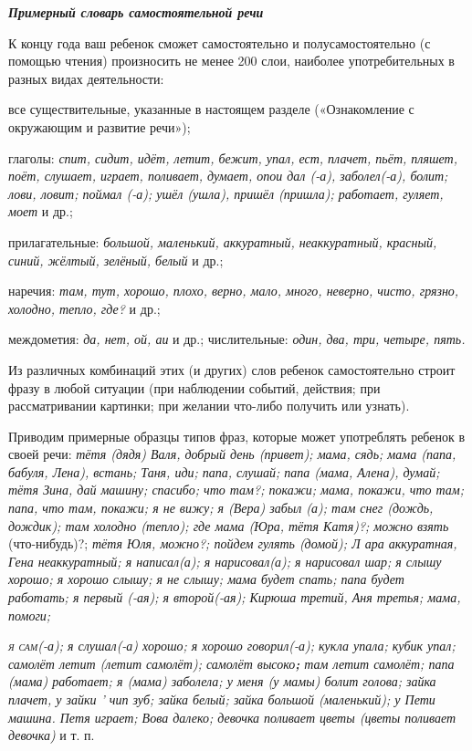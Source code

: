 \documentclass{book}
\renewcommand{\emph}[1]{\textit{#1}}
\begin{document}
\emph{\textbf{Примерный словарь самостоятельной речи}}

К концу года ваш ребенок сможет самостоятельно и полусамостоятельно (с
помощью чтения) произносить не менее 200 слои, наиболее употребительных
в разных видах деятельности:

все существительные, указанные в настоящем разделе («Ознакомление с
окружающим и развитие речи»);

глаголы: \emph{спит, сидит, идёт, летит, бежит, упал, ест, плачет, пьёт,
пляшет, поёт, слушает, играет, поливает, думает, опои дал (-а),
заболел(-а), болит; лови, ловит; поймал (-а); ушёл (ушла), пришёл
(пришла); работает, гуляет, моет} и др.;

прилагательные: \emph{большой, маленький, аккуратный, неаккуратный,
красный, синий, жёлтый, зелёный, белый} и др.;

наречия: \emph{там, тут, хорошо, плохо, верно, мало, много, неверно,
чисто, грязно, холодно, тепло, где?} и др.;

междометия: \emph{да, нет, ой, аи} и др.; числительные: \emph{один, два,
три, четыре, пять.}

Из различных комбинаций этих (и других) слов ребенок самостоятельно
строит фразу в любой ситуации (при наблюдении событий, действия; при
рассматривании картинки; при желании что-либо получить или узнать).

Приводим примерные образцы типов фраз, которые может употреблять ребенок
в своей речи: \emph{тётя (дядя) Валя, добрый день (привет); мама, сядь;
мама (папа, бабуля, Лена), встань; Таня, иди; папа, слушай; папа (мама,
Алена), думай; тётя Зина, дай машину; спасибо; что там?; покажи; мама,
покажи, что там; папа, что там, покажи; я не вижу; я (Вера) забыл (а);
там снег (дождь, дождик); там холодно (тепло); где мама (Юра, тётя
Катя)?; можно взять} (что-нибудь)?; \emph{тётя Юля, можно?; пойдем
гулять (домой); Л ара аккуратная, Гена неаккуратный; я написал(а); я
нарисовал(а); я нарисовал шар; я слышу хорошо; я хорошо слышу; я не
слышу; мама будет спать; папа будет работать; я первый (-ая); я
второй(-ая); Кирюша третий, Аня третья; мама, помоги;}

\emph{\textsc{я сам}(-а); я слушал(-а) хорошо; я хорошо говорил(-а);
кукла упала; кубик упал; самолёт летит (летит самолёт); самолёт
высоко\textbf{;} там летит самолёт; папа (мама) работает; я (мама)
заболела; у меня (у мамы) болит голова; зайка плачет, у зайки ' чип зуб;
зайка белый; зайка большой (маленький); у Пети машина. Петя играет; Вова
далеко; девочка поливает цветы (цветы поливает девочка)} и т. п.
\end{document}
